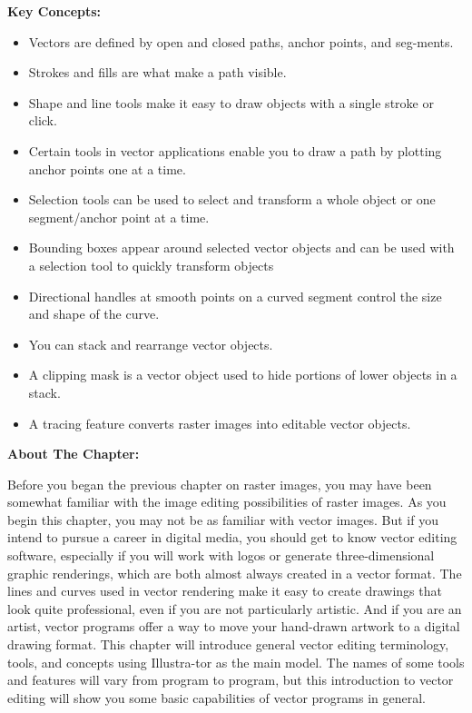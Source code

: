 \documentclass{report}
\begin{document}
    \pagebreak \bigbreak \noindent
    \begin{Large}
      \textbf{Key Concepts:}
    \end{Large}
    \bigbreak \noindent 
    \begin{itemize}
      \item Vectors are defined by open and closed paths, anchor points, and seg-ments. 
      \item Strokes and fills are what make a path visible. 
      \item Shape and line tools make it easy to draw objects with a single stroke or click. 
      \item Certain tools in vector applications enable you to draw a path by plotting anchor points one at a time. 
      \item Selection tools can be used to select and transform a whole object or one segment/anchor point at a time. 
      \item Bounding boxes appear around selected vector objects and can be used with a selection tool to quickly transform objects
      \item Directional handles at smooth points on a curved segment control the size and shape of the curve.
      \item You can stack and rearrange vector objects. 
      \item A clipping mask is a vector object used to hide portions of lower objects in a stack. 
      \item A tracing feature converts raster images into editable vector objects. 
    \end{itemize}

    \bigbreak \noindent \bigbreak \noindent 
    \begin{Large}
      \textbf{About The Chapter:}
    \end{Large}
    \bigbreak \noindent 
    Before you began the previous chapter on raster images, you may have been somewhat familiar with the image editing possibilities of raster images. As you begin this chapter, you may not be as familiar with vector images. But if you intend to pursue a career in digital media, you should get to know vector editing software, especially if you will work with logos or generate three-dimensional graphic renderings, which are both almost always created in a vector format. The lines and curves used in vector rendering make it easy to create drawings that look quite professional, even if you are not particularly artistic. And if you are an artist, vector programs offer a way to move your hand-drawn artwork to a digital drawing format.
    \bigbreak \noindent 
    This chapter will introduce general vector editing terminology, tools, and concepts using Illustra-tor as the main model. The names of some tools and features will vary from program to program, but this introduction to vector editing will show you some basic capabilities of vector programs in general.
\end{document}
